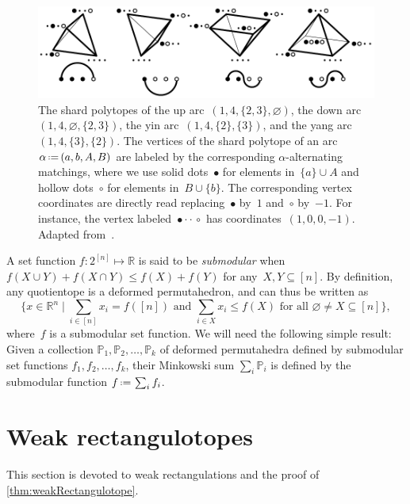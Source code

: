\documentclass{amsart}
\theoremstyle{definition}
\newcommand{\R}{\mathbb{R}} %
\newcommand{\Bigset}[2]{\Big\{ #1 \;\Big|\; #2 \Big\}} %
\newcommand{\eqdef}{\mbox{\,\raisebox{0.2ex}{\scriptsize\ensuremath{\mathrm:}}\ensuremath{=}\,}} %
\newcommand{\darkblue}{\color{darkblue}} %
\newcommand{\defn}[1]{\textsl{\darkblue #1}} %
\newcommand{\polytope}[1]{\mathds{#1}} %
\begin{document}
\begin{figure}
	\capstart
	\centerline{\includegraphics[scale=1]{shardPolytopes}}
	\caption{The shard polytopes of the up arc~$(1, 4, \{2, 3\}, \varnothing)$, the down arc~$(1, 4, \varnothing, \{2, 3\})$, the yin arc~$(1, 4, \{2\}, \{3\})$, and the yang arc~$(1, 4, \{3\}, \{2\})$. The vertices of the shard polytope of an arc~$\alpha \eqdef (a, b, A, B)$ are labeled by the corresponding $\alpha$-alternating matchings, where we use solid dots~$\bullet$ for elements in~$\{a\} \cup A$ and hollow dots~$\circ$ for elements in~$B \cup \{b\}$. The corresponding vertex coordinates are directly read replacing~$\bullet$ by~$1$ and~$\circ$ by~$-1$. For instance, the vertex labeled~${\bullet \cdot \cdot \,\circ}$ has coordinates~$(1,0,0,-1)$. Adapted from~\cite[Fig.~10]{MR4584712}.}
	\label{fig:shardPolytopes}
\end{figure}

\pagebreak 
A set function $f:2^{[n]}\mapsto \R$ is said to be \defn{submodular} when $f(X \cup Y) + f(X \cap Y) \le f(X) + f(Y)$ for any~$X, Y \subseteq [n]$.
By definition, any quotientope is a deformed permutahedron, and can thus be written as
  \[
  \Bigset{x \in \R^n}{ \sum_{i \in [n]} x_i = f([n]) \text{ and } \sum_{i \in X} x_i \le f(X) \text{ for all } \varnothing \ne X \subseteq [n]},
  \]
where~$f$ is a submodular set function.
We will need the following simple result: Given a collection $\polytope{P}_1, \polytope{P}_2,\ldots ,\polytope{P}_k$ of deformed permutahedra defined by submodular set functions $f_1,f_2,\ldots ,f_k$, their Minkowski sum $\sum_i \polytope{P}_i$ is defined by the submodular function $f \eqdef \sum_i f_i$.


\section{Weak rectangulotopes}
\label{sec:weakRectangulotopes}

This section is devoted to weak rectangulations and the proof of \cref{thm:weakRectangulotope}.
\end{document}
